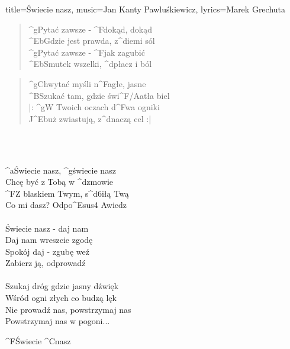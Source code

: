 \newpage
\begin{song}{title={Świecie nasz}, music={Jan Kanty Pawluśkiewicz}, lyrics={Marek Grechuta}}
\begin{multicols}{2}
	\begin{intro}
		   				
	\end{intro}
    \begin{verse}
	    ^{g}Pytać zawsze - ^{F}dokąd, dokąd \\
		^{Eb}Gdzie jest prawda, z^{d}iemi sól \\
		^{g}Pytać zawsze - ^{F}jak zagubić \\
		^{Eb}Smutek wszelki, ^{d}płacz i ból
    \end{verse}
    \begin{verse}
	    ^{g}Chwytać myśli n^{F}agłe, jasne \\
		^{B}Szukać tam, gdzie świ^{F/A}atła biel \\ 
		|: ^{g}W Twoich oczach d^{F}wa ogniki \\
		J^{Eb}uż zwiastują, z^{d}naczą cel :|
    \end{verse}
        \\
        \\
    \begin{interlude}
    	^{a}Świecie nasz, ^{g}świecie nasz \\
		Chcę być z Tobą w ^{d}zmowie \\ 
		^{F}Z blaskiem Twym, s^{d6}iłą Twą \\
		Co mi dasz? Odpo^{Esus4     A}wiedz \\ \\
		Świecie nasz - daj nam \\
		Daj nam wreszcie zgodę \\ 
		Spokój daj - zgubę weź \\
		Zabierz ją, odprowadź \\ \\
		Szukaj dróg gdzie jasny dźwięk \\
		Wśród ogni złych co budzą lęk \\ 
		Nie prowadź nas, powstrzymaj nas \\
		Powstrzymaj nas w pogoni...
    \end{interlude}
    \begin{chorus}
    	^{F}Świecie ^{C}nasz \\

\end{chorus}
\end{multicols}
\end{song}
